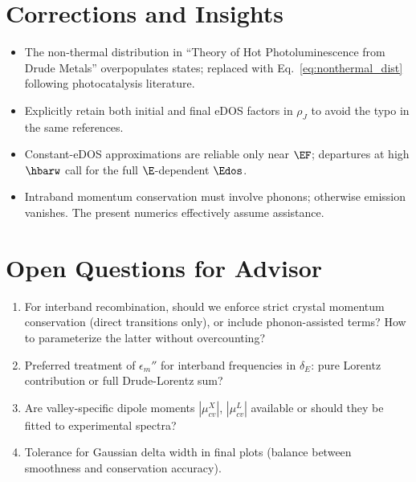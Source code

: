 \section{Corrections and Insights}
\begin{itemize}
  \item The non-thermal distribution in ``Theory of Hot Photoluminescence from Drude Metals'' overpopulates states; replaced with Eq.~\eqref{eq:nonthermal_dist} following photocatalysis literature.
  \item Explicitly retain both initial and final eDOS factors in $\rho_{J}$ to avoid the typo in the same references.
  \item Constant-eDOS approximations are reliable only near $\EF$; departures at high $\hbarw$ call for the full $\E$-dependent $\Edos$.
  \item Intraband momentum conservation must involve phonons; otherwise emission vanishes. The present numerics effectively assume assistance.
\end{itemize}

\section{Open Questions for Advisor}
\begin{enumerate}
  \item For interband recombination, should we enforce strict crystal momentum conservation (direct transitions only), or include phonon-assisted terms? How to parameterize the latter without overcounting?
  \item Preferred treatment of $\epsilon_{m}''$ for interband frequencies in $\delta_{E}$: pure Lorentz contribution or full Drude-Lorentz sum?
  \item Are valley-specific dipole moments $|\mu^{X}_{cv}|$, $|\mu^{L}_{cv}|$ available or should they be fitted to experimental spectra?
  \item Tolerance for Gaussian delta width in final plots (balance between smoothness and conservation accuracy).
\end{enumerate}

